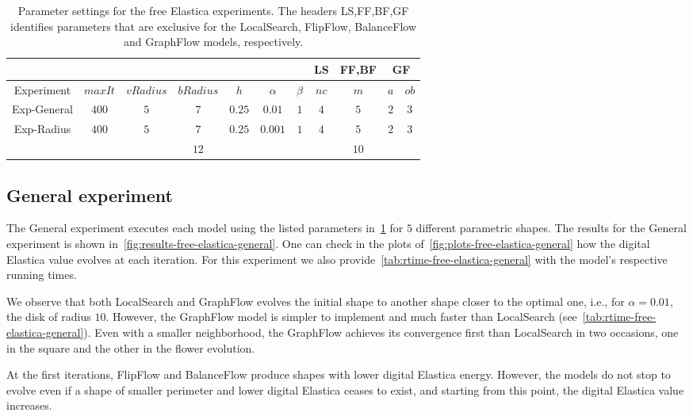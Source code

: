 \begin{table}
\centering
\begin{tabular}{|c|c|c|c|c|c|c|c|c|c|c|}
\cline{8-11}
\multicolumn{7}{c|}{} & LS & FF,BF & \multicolumn{2}{|c|}{GF}\\
\hline
Experiment & $maxIt$ & $vRadius$ & $bRadius$ & $h$ & $\alpha$ & $\beta$  & $nc$ & $m$ & $a$ & $ob$ \\
\hline
Exp-General & $400$ & $5$ & $7$ & $0.25$ & $0.01$ & $1$  & $4$ & $5$ & $2$ & $3$ \\
\hline
\multirow{2}{*}{Exp-Radius} & \multirow{2}{*}{$400$} & \multirow{2}{*}{$5$} & $7$ & \multirow{2}{*}{$0.25$} &  \multirow{2}{*}{$0.001$} & \multirow{2}{*}{$1$}  & \multirow{2}{*}{$4$} & $5$ & \multirow{2}{*}{$2$} & \multirow{2}{*}{$3$} \\
& &  & $12$ & &  & & & $10$ & &  \\
\hline
\end{tabular}
\caption{Parameter settings for the free Elastica experiments. The headers LS,FF,BF,GF identifies parameters that are exclusive for the LocalSearch, FlipFlow, BalanceFlow and GraphFlow models, respectively.}
\label{tab:free-elastica-parameters-summary}
\end{table}

\subsection{General experiment}

  The General experiment executes each model using the listed parameters in~\cref{tab:free-elastica-parameters-summary} for $5$ different parametric shapes. The results for the General experiment is shown in~\cref{fig:results-free-elastica-general}. One can check in the plots of~\cref{fig:plots-free-elastica-general} how the digital Elastica value evolves at each iteration. For this experiment we also provide~\cref{tab:rtime-free-elastica-general} with the model's respective running times.
  

We observe that both LocalSearch and GraphFlow evolves the initial shape to another shape closer to the optimal one, i.e., for $\alpha=0.01$, the disk of radius $10$. However, the GraphFlow model is simpler to implement and much faster than LocalSearch (see~\cref{tab:rtime-free-elastica-general}). Even with a smaller neighborhood, the GraphFlow achieves its convergence first than LocalSearch in two occasions, one in the square and the other in the flower evolution.

At the first iterations, FlipFlow and BalanceFlow produce shapes with lower digital Elastica energy. However, the models do not stop to evolve even if a shape of smaller perimeter and lower digital Elastica ceases to exist, and starting from this point, the digital Elastica value increases.


